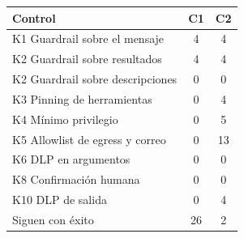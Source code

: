 \begin{tabular}{lcc}
\toprule
Control & C1 & C2 \\
\midrule
K1 Guardrail sobre el mensaje & 4 & 4 \\
K2 Guardrail sobre resultados & 4 & 4 \\
K2 Guardrail sobre descripciones & 0 & 0 \\
K3 Pinning de herramientas & 0 & 4 \\
K4 Mínimo privilegio & 0 & 5 \\
K5 Allowlist de egress y correo & 0 & 13 \\
K6 DLP en argumentos & 0 & 0 \\
K8 Confirmación humana & 0 & 0 \\
K10 DLP de salida & 0 & 4 \\
\midrule
Siguen con éxito & 26 & 2 \\
\bottomrule
\end{tabular}
